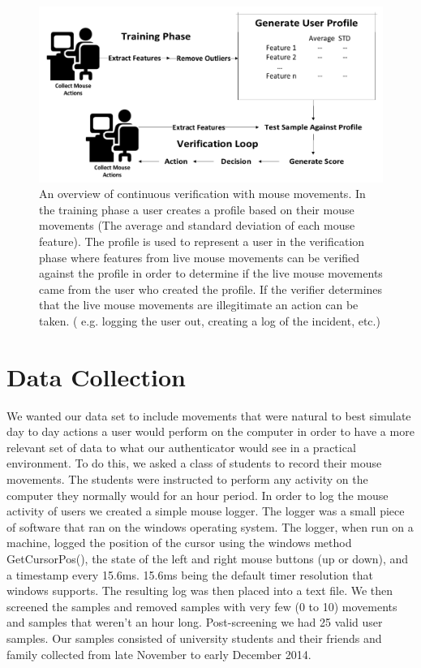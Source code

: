 \documentclass[conference]{IEEEtran}
\begin{document}
\begin{figure}[h!]
  \includegraphics[width=1\linewidth]{Overview.pdf}
\caption{An overview of continuous verification with mouse movements. In the training phase a user creates a profile based on their mouse movements (The average and standard deviation of each mouse feature). The profile is used to represent a user in the verification phase where features from live mouse movements can be verified against the profile in order to determine if the live mouse movements came from the user who created the profile. If the verifier determines that the live mouse movements are illegitimate an action can be taken. ( e.g. logging the user out, creating a log of the incident, etc.)}
\end{figure}


\section{Data Collection}
We wanted our data set to include movements that were natural to best simulate day to day actions a user would perform on the computer in order to have a more relevant set of data to what our authenticator would see in a practical environment. To do this, we asked a class of students to record their mouse movements. The students were instructed to perform any activity on the computer they normally would for an hour period.  
	In order to log the mouse activity of users we created a simple mouse logger.  The logger was a small piece of software that ran on the windows operating system. The logger, when run on a machine, logged the position of the cursor using the windows method GetCursorPos(), the state of the left and right mouse buttons (up or down), and a timestamp every 15.6ms. 15.6ms being the default timer resolution that windows supports. The resulting log was then placed into a text file. 
We then screened the samples and removed samples with very few (0 to 10) movements and samples that weren't an hour long. Post-screening we had 25 valid user samples.  Our samples consisted of university students and their friends and family collected from late November to early December 2014.
\end{document}

